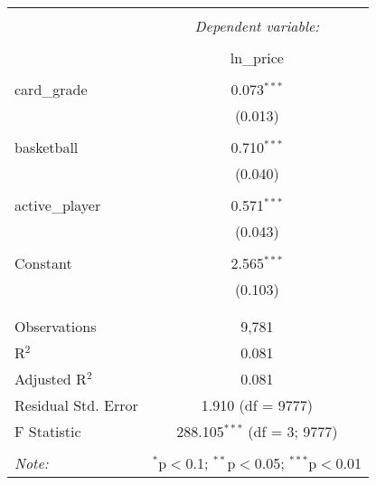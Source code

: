 
\begin{table}[!htbp] \centering 
  \caption{} 
  \label{} 
\begin{tabular}{@{\extracolsep{5pt}}lc} 
\\[-1.8ex]\hline 
\hline \\[-1.8ex] 
 & \multicolumn{1}{c}{\textit{Dependent variable:}} \\ 
\cline{2-2} 
\\[-1.8ex] & ln\_price \\ 
\hline \\[-1.8ex] 
 card\_grade & 0.073$^{***}$ \\ 
  & (0.013) \\ 
  & \\ 
 basketball & 0.710$^{***}$ \\ 
  & (0.040) \\ 
  & \\ 
 active\_player & 0.571$^{***}$ \\ 
  & (0.043) \\ 
  & \\ 
 Constant & 2.565$^{***}$ \\ 
  & (0.103) \\ 
  & \\ 
\hline \\[-1.8ex] 
Observations & 9,781 \\ 
R$^{2}$ & 0.081 \\ 
Adjusted R$^{2}$ & 0.081 \\ 
Residual Std. Error & 1.910 (df = 9777) \\ 
F Statistic & 288.105$^{***}$ (df = 3; 9777) \\ 
\hline 
\hline \\[-1.8ex] 
\textit{Note:}  & \multicolumn{1}{r}{$^{*}$p$<$0.1; $^{**}$p$<$0.05; $^{***}$p$<$0.01} \\ 
\end{tabular} 
\end{table} 
